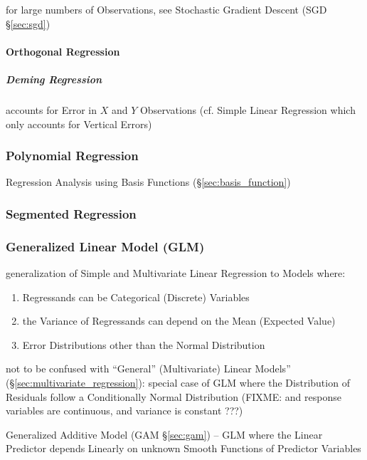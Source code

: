 for large numbers of Observations, see Stochastic Gradient Descent (SGD
\S\ref{sec:sgd})



\paragraph{Orthogonal Regression}\label{sec:orthogonal_regression}\hfill

\subparagraph{Deming Regression}\label{sec:deming_regression}\hfill

accounts for Error in $X$ and $Y$ Observations (cf. Simple Linear Regression
which only accounts for Vertical Errors)



\subsubsection{Polynomial Regression}\label{sec:polynomial_regression}

Regression Analysis using Basis Functions (\S\ref{sec:basis_function})



\subsubsection{Segmented Regression}\label{sec:segmented_regression}

\subsubsection{Generalized Linear Model (GLM)}\label{sec:glm}

generalization of Simple and Multivariate Linear Regression to Models where:
\begin{enumerate}
  \item Regressands can be Categorical (Discrete) Variables
  \item the Variance of Regressands can depend on the Mean (Expected Value)
  \item Error Distributions other than the Normal Distribution
\end{enumerate}

not to be confused with ``General'' (Multivariate) Linear Models''
(\S\ref{sec:multivariate_regression}): special case of GLM where the
Distribution of Residuals follow a Conditionally Normal Distribution
(FIXME: and response variables are continuous, and variance is constant ???)

\fist Generalized Additive Model (GAM \S\ref{sec:gam}) -- GLM where the Linear
Predictor depends Linearly on unknown Smooth Functions of Predictor Variables

